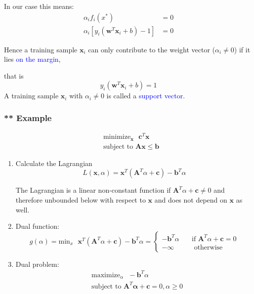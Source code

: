 \documentclass[a4paper,10pt,twoside=true,DIV=10,headsepline,plainheadsepline]{scrartcl}
\begin{document}
		In our case this means:
			\begin{align} 
				\alpha_i f_i(x^*) &= 0 \\
				\alpha_i [y_i(\mathbf{w}^T \mathbf{x}_i + b) - 1] &= 0
			\end{align}
		
		Hence a training sample $\mathbf{x}_i$ can only contribute to the weight vector ($ \alpha_i \neq 0$) if it lies \textcolor{blue}{on the margin}, 

that is
			\begin{equation} 
				y_i(\mathbf{w}^T \mathbf{x}_i + b) = 1
			\end{equation}
		A training sample $\mathbf{x}_i$ with $ \alpha_i \neq 0$ is called a \textcolor{blue}{support vector}.

		\subsubsection{** Example}
			\begin{align}
				&\textrm{minimize}_{\mathbf{x}} \textrm{ } \mathbf{c}^T \mathbf{x} \\
				&\textrm{subject to } \mathbf{A} \mathbf{x} \leq \mathbf{b} 
			\end{align}

		\begin{enumerate}
			\item Calculate the Lagrangian
				\begin{equation} 
					L(\mathbf{x}, \alpha) = \mathbf{x}^T (\mathbf{A}^T \alpha + \mathbf{c}) - \mathbf{b}^T \alpha
				\end{equation}
			
			The Lagrangian is a linear non-constant function if $\mathbf{A}^T \alpha + \mathbf{c} \neq 0$ and therefore unbounded below with respect to $\mathbf{x}$ and does not depend on $\mathbf{x}$ as well.
			\item Dual function:
				\begin{equation} 
					g (\alpha) = \textrm{min}_x \textrm{ } \mathbf{x}^T (\mathbf{A}^T \alpha + \mathbf{c}) - \mathbf{b}^T \alpha = 
				\begin{cases}
    					- \mathbf{b}^T \alpha  & \quad \text{if } \mathbf{A}^T \alpha + \mathbf{c} = 0\\
    					- \infty  & \quad \text{ otherwise} 
 				\end{cases}
				\end{equation}

			\item Dual problem:
				\begin{align}
				&\textrm{maximize}_{\alpha} \textrm{ } - \mathbf{b}^T \alpha \\
				&\textrm{subject to } \mathbf{A}^T \mathbf{\alpha} + \mathbf{c} = 0, \alpha \geq 0
			\end{align}
		
		\end{enumerate}
	
\end{document}
